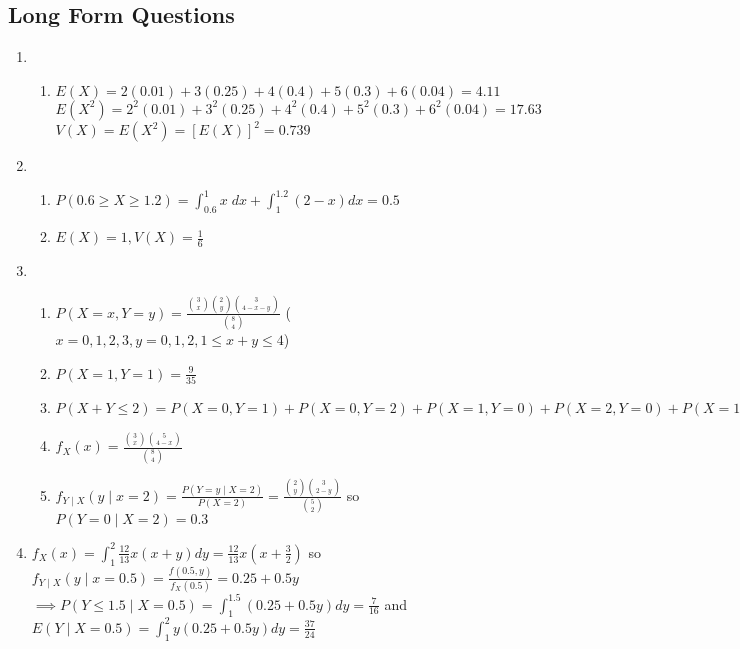 \documentclass[12pt, a4paper]{article}
\begin{document}
\subsection*{Long Form Questions}
\begin{enumerate}[Q\arabic*.]
  \item 
    \begin{enumerate}[(\roman*)]
      \item $E(X) = 2(0.01) + 3(0.25) + 4(0.4) + 5(0.3) + 6(0.04) = 4.11$\\
        $E(X^2) = 2^2(0.01) + 3^2(0.25) + 4^2(0.4) + 5^2(0.3) + 6^2(0.04) = 17.63$\\
        $V(X) = E(X^2) = [E(X)]^2 = 0.739$
    \end{enumerate}

  \item 
    \begin{enumerate}[(\roman*)]
      \item $P(0.6\geq X\geq 1.2) = \int^1_{0.6}x\;dx + \int^{1.2}_1 (2-x)dx = 0.5$ 
      \item $E(X) = 1, V(X) = \frac{1}{6}$
    \end{enumerate}

  \item 
    \begin{enumerate}[(\roman*)]
      \item $P(X=x, Y=y) = \frac{\binom 3x \binom 2y \binom 3{4-x-y}}{\binom 84}$ ($x = 0,1,2, 3, y = 0,1,2, 1\leq x+y \leq 4$) 

      \item $P(X=1,Y=1) = \frac{9}{35}$

      \item $P(X+Y\leq 2) = P(X=0,Y=1) + P(X=0, Y=2) + P(X=1, Y=0) + P(X=2, Y=0) + P(X=1, Y=1) = \frac{1}{2}$


      \item $f_X(x) = \frac{\binom 3x \binom 5{4-x}}{\binom 84}$ 

      \item $f_{Y\mid X}(y\mid x=2) = \frac{P(Y=y\mid X=2)}{P(X=2)}= \frac{\binom 2y \binom 3{2-y}}{\binom 52}$ so $P(Y=0\mid X=2) = 0.3$
    \end{enumerate}

  \item $f_X(x) = \int^2_1 \frac{12}{13}x(x+y)dy = \frac{12}{13}x(x+\frac{3}{2})$ so $f_{Y\mid X}(y \mid x= 0.5)= \frac{f(0.5, y)}{f_X(0.5)} = 0.25 + 0.5y$\\
    $\implies P(Y \leq 1.5 \mid X= 0.5)= \int^{1.5}_1 (0.25 + 0.5y)dy= \frac{7}{16}$ and $E(Y\mid X=0.5) = \int^2_1 y(0.25+0.5y)dy = \frac{37}{24}$
\end{enumerate}
\end{document}
